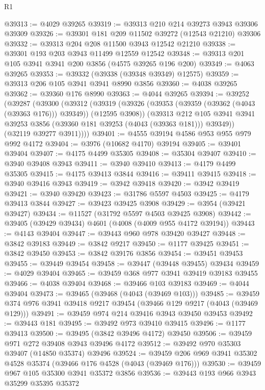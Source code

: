 \begin{lexlean}{R1}
\begin{coremodule}
@39313 := @4029 @39265
@39319 := @39313 @210 @214 @39273 @3943 @39306 @39309
@39326 := @39301 @181 @209 @11502 @39272 (@12543 @21210) @39306
@39332 := @39313 @204 @208 @11500 @3943 @12542 @21210
@39338 := @39301 @193 @203 @3943 @11499 @12559 @12542
@39348 := @39313 @201 @105 @3941 @3941 @200 @3856 (@4575 @39265 @196 @200)
@39349 := @4063 @39265
@39353 := @39332 (@39338 (@39348 @39349) @12575)
@39359 := @39313 @206 @105 @3941 @3941 @8990 @3856
@39360 := @4038 @39265
@39362 := @39360 @176 @8990
@39363 := @4044 @39265
@39394 := @39252
    (@39287
      (@39300
        (@39312
          (@39319
            (@39326 (@39353 (@39359 (@39362 (@4043 (@39363 @176))) @39349)) (@12595 @3908))
            (@39313
              @212
              @105
              @3941
              @3941
              @39253
              @3856
              (@39360 @181 @39253 (@4043 (@39363 @181)))
              @39349))
          (@32119 @39277 @3911))))
@39401 := @4555 @39194 @4586 @953 @955 @979 @992 @4172
@39404 := @3976 (@10682 @4170) @39194
@39405 := @39401 @39404
@39407 := @4175 @4499 @35305
@39408 := @35304 @39407
@39410 := @3940 @39408 @3943
@39411 := @3940 @39410
@39413 := @4179 @4499 @35305
@39415 := @4175 @39413 @3844
@39416 := @39411 @39415
@39418 := @3940 @39416 @3943
@39419 := @3942 @39418
@39420 := @3942 @39419
@39421 := @3940 @39420
@39423 := @31786 @5597 @4503
@39425 := @4179 @39413 @3844
@39427 := @39423 @39425 @3908
@39429 := @3954 (@39421 @39427)
@39434 := @11527 (@31792 @5597 @4503 @39425 @3908)
@39442 := @39405 (@39429 @39434) @4601 (@4008 (@4009 @955 @4172 @39194))
@39443 := @4143 @39404
@39447 := @39443 @960 @978 @39420 @39427
@39448 := @3842 @39183
@39449 := @3842 @9217
@39450 := @1177 @39425
@39451 := @3842 @39450
@39453 := @3842 @39176 @3856
@39454 := @39451 @39453
@39455 := @39449 @39454
@39458 := @39447 (@39448 @39455) @39434
@39459 := @4029 @39404
@39465 := @39459 @368 @977 @3941 @39419 @39183 @39455
@39466 := @4038 @39404
@39468 := @39466 @103 @39183
@39469 := @4044 @39404
@39473 := @39465 (@39468 (@4043 (@39469 @103)))
@39485 := @39459 @374 @976 @3941 @39418 @9217 @39454 (@39466 @129 @9217 (@4043 (@39469 @129)))
@39491 := @39459 @974 @214 @39416 @3943 @39450 @39453
@39492 := @39443 @181
@39495 := @39492 @973 @39410 @39415
@39496 := @1177 @39413
@39500 := @39495 (@3842 @39496 @4172) @39450
@39506 := @39459 @971 @272 @39408 @3943 @39496 @4172
@39512 := @39492 @970 @35303 @39407 (@14850 @35374) @39496
@39524 := @39459 @206 @969 @3941 @35302 @4528 @35374 (@39466 @176 @4528 (@4043 (@39469 @176)))
@39530 := @39459 @967 @105 @35300 @3941 @35372 @3856
@39536 := @39443 @193 @966 @3943 @35299 @35395 @35372

\end{coremodule}
\end{lexlean}

